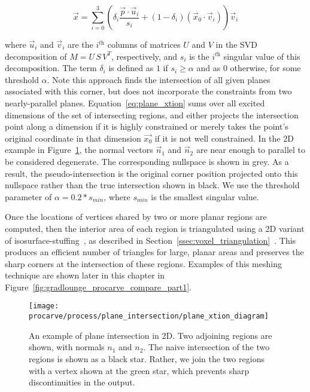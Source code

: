 \documentclass[12pt,onecolumn,oneside]{book}
\begin{document}
\begin{equation}
	\vec{x} = \sum_{i = 0}^{3} \left( \delta_i \dfrac{\vec{p} \cdot \vec{u}_i}{s_i} + (1-\delta_i) ( \vec{x}_0 \cdot \vec{v}_i ) \right) \vec{v}_i
	\label{eq:plane_xtion}
\end{equation}

where $\vec{u}_i$ and $\vec{v}_i$ are the $i^{\textit{th}}$ columns of matrices $U$ and $V$ in the SVD decomposition of $M = U \, S \, V^T$, respectively, and $s_i$ is the $i^{\textit{th}}$ singular value of this decomposition.  The term $\delta_i$ is defined as $1$ if $s_i \geq \alpha$ and as $0$ otherwise, for some threshold $\alpha$.  Note this approach finds the intersection of all given planes associated with this corner, but does not incorporate the constraints from two nearly-parallel planes.  Equation~\ref{eq:plane_xtion} sums over all excited dimensions of the set of intersecting regions, and either projects the intersection point along a dimension if it is highly constrained or merely takes the point's original coordinate in that dimension $\vec{x_0}$ if it is not well constrained.  In the 2D example in Figure~\ref{fig:plane_xtion}, the normal vectors $\vec{n}_1$ and $\vec{n}_2$ are near enough to parallel to be considered degenerate.  The corresponding nullspace is shown in grey.  As a result, the pseudo-intersection is the original corner position projected onto this nullspace rather than the true intersection shown in black. We use the threshold parameter of $\alpha=0.2 * s_{min}$, where $s_{min}$ is the smallest singular value.

Once the locations of vertices shared by two or more planar regions are computed, then the interior area of each region is triangulated using a 2D variant of isosurface-stuffing~\cite{Isostuffing}, as described in Section~\ref{ssec:voxel_triangulation}~\cite{Turner13}.  This produces an efficient number of triangles for large, planar areas and preserves the sharp corners at the intersection of these regions.  Examples of this meshing technique are shown later in this chapter in Figure~\ref{fig:gradlounge_procarve_compare_part1}.

\begin{figure}
	\centerline{\texttt{[image: procarve/process/plane\_intersection/plane\_xtion\_diagram]}}
	\caption[Computing intersection point for planar regions.]{An example of plane intersection in 2D.  Two adjoining regions are shown, with normals $n_1$ and $n_2$.  The naive intersection of the two regions is shown as a black star.  Rather, we join the two regions with a vertex shown at the green star, which prevents sharp discontinuities in the output.}
	\label{fig:plane_xtion}
\end{figure}
\end{document}

